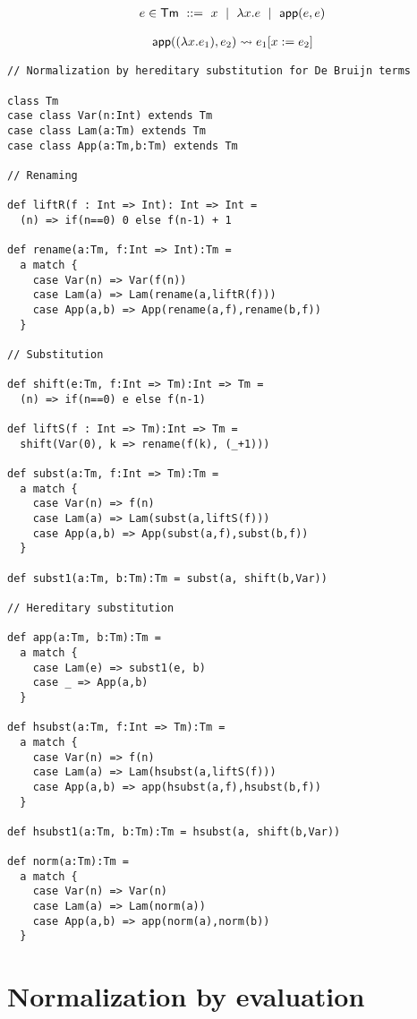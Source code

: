 \documentclass[a4paper, 11pt]{article}
\theoremstyle{definition}
\begin{document}
\begin{align*}
  e \in \mathsf{Tm} \ ::=\  x \ \mid \  \lambda x. e \ \mid \  \mathsf{app}(e,e)
\end{align*}

\begin{align*}
  \mathsf{app}((\lambda x. e_1), e_2) \rightsquigarrow e_1[x := e_2]
\end{align*}


\begin{lstlisting}
// Normalization by hereditary substitution for De Bruijn terms

class Tm
case class Var(n:Int) extends Tm
case class Lam(a:Tm) extends Tm
case class App(a:Tm,b:Tm) extends Tm

// Renaming

def liftR(f : Int => Int): Int => Int =
  (n) => if(n==0) 0 else f(n-1) + 1

def rename(a:Tm, f:Int => Int):Tm =
  a match {
    case Var(n) => Var(f(n))
    case Lam(a) => Lam(rename(a,liftR(f)))
    case App(a,b) => App(rename(a,f),rename(b,f))
  }

// Substitution

def shift(e:Tm, f:Int => Tm):Int => Tm =
  (n) => if(n==0) e else f(n-1)

def liftS(f : Int => Tm):Int => Tm =
  shift(Var(0), k => rename(f(k), (_+1)))

def subst(a:Tm, f:Int => Tm):Tm =
  a match {
    case Var(n) => f(n)
    case Lam(a) => Lam(subst(a,liftS(f)))
    case App(a,b) => App(subst(a,f),subst(b,f))
  }

def subst1(a:Tm, b:Tm):Tm = subst(a, shift(b,Var))

// Hereditary substitution

def app(a:Tm, b:Tm):Tm =
  a match {
    case Lam(e) => subst1(e, b)
    case _ => App(a,b)
  }

def hsubst(a:Tm, f:Int => Tm):Tm =
  a match {
    case Var(n) => f(n)
    case Lam(a) => Lam(hsubst(a,liftS(f)))
    case App(a,b) => app(hsubst(a,f),hsubst(b,f))
  }

def hsubst1(a:Tm, b:Tm):Tm = hsubst(a, shift(b,Var))

def norm(a:Tm):Tm =
  a match {
    case Var(n) => Var(n)
    case Lam(a) => Lam(norm(a))
    case App(a,b) => app(norm(a),norm(b))
  }
\end{lstlisting}


\section{Normalization by evaluation}
\end{document}
